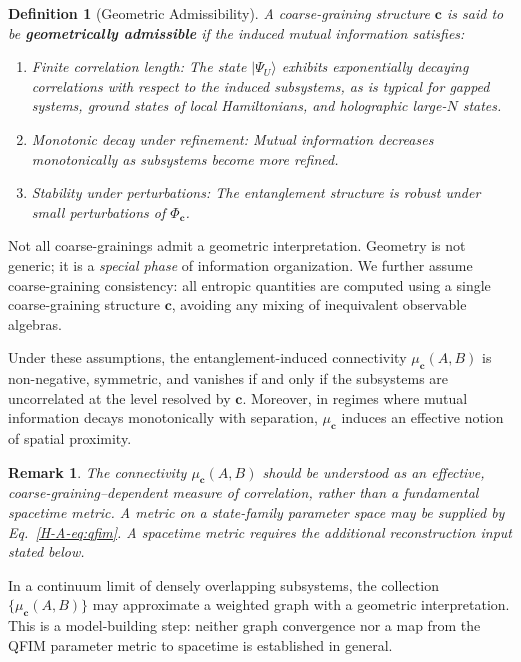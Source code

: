 \documentclass[12pt,a4paper,openany]{book}
\newtheorem{definition}[theorem]{Definition}
\newtheorem{remark}[theorem]{Remark}
\begin{document}
\begin{definition}[Geometric Admissibility]
\label{H-A-def:geoadmit}
A coarse-graining structure $\mathbf{c}$ is said to be \textbf{geometrically admissible} if the induced mutual information satisfies:
\begin{enumerate}
\item \emph{Finite correlation length:} The state $|\Psi_U\rangle$ exhibits exponentially decaying correlations with respect to the induced subsystems, as is typical for gapped systems, ground states of local Hamiltonians, and holographic large-$N$ states.
\item \emph{Monotonic decay under refinement:} Mutual information decreases monotonically as subsystems become more refined.
\item \emph{Stability under perturbations:} The entanglement structure is robust under small perturbations of $\Phi_{\mathbf{c}}$.
\end{enumerate}
\end{definition}

Not all coarse-grainings admit a geometric interpretation. 
Geometry is not generic; it is a \emph{special phase} of information organization.
We further assume coarse-graining consistency: all entropic quantities are computed using a single coarse-graining structure $\mathbf{c}$, avoiding any mixing of inequivalent observable algebras.

Under these assumptions, the entanglement-induced connectivity $\mu_{\mathbf{c}}(A,B)$ is non-negative, symmetric, and vanishes if and only if the subsystems are uncorrelated at the level resolved by $\mathbf{c}$.
Moreover, in regimes where mutual information decays monotonically with separation, $\mu_{\mathbf{c}}$ induces an effective notion of spatial proximity.

\begin{remark}
The connectivity $\mu_{\mathbf{c}}(A,B)$ should be understood as an \emph{effective, coarse-graining--dependent measure of correlation}, rather than a fundamental spacetime metric.
A metric on a state-family parameter space may be supplied by Eq.~\eqref{H-A-eq:qfim}.  A spacetime metric requires the additional reconstruction input stated below.
\end{remark}

In a continuum limit of densely overlapping subsystems, the collection $\{\mu_{\mathbf{c}}(A,B)\}$ may approximate a weighted graph with a geometric interpretation.  This is a model-building step: neither graph convergence nor a map from the QFIM parameter metric to spacetime is established in general.
\end{document}
